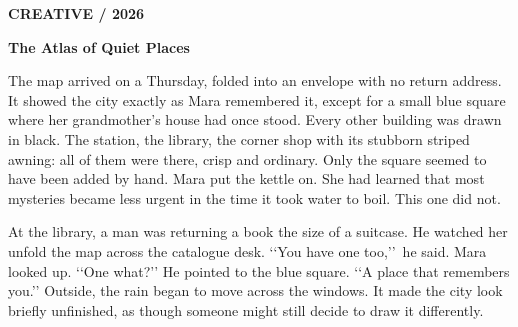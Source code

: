 \documentclass[11pt,a4paper]{article}
\newcommand{\eyebrow}[1]{{\small\sffamily\bfseries\color{accent}#1}\par\vspace{5mm}}
\newcommand{\hero}[2]{{\fontsize{32}{36}\selectfont\sffamily\bfseries #1\par}\vspace{4mm}{\large\color{quiet}#2\par}\vspace{6mm}{\color{accent}\rule{\linewidth}{1.5pt}}\vspace{5mm}}
\begin{document}
\eyebrow{CREATIVE / 2026}
\hero{The Atlas of Quiet Places}{A short story / Alex Morgan}
\vspace{8mm}
The map arrived on a Thursday, folded into an envelope with no return address. It showed the city exactly as Mara remembered it, except for a small blue square where her grandmother's house had once stood.
Every other building was drawn in black. The station, the library, the corner shop with its stubborn striped awning: all of them were there, crisp and ordinary. Only the square seemed to have been added by hand.
Mara put the kettle on. She had learned that most mysteries became less urgent in the time it took water to boil. This one did not.
\begin{center}\vspace{5mm}\textasteriskcentered\quad\textasteriskcentered\quad\textasteriskcentered\vspace{5mm}\end{center}
At the library, a man was returning a book the size of a suitcase. He watched her unfold the map across the catalogue desk.
\lq\lq You have one too,\rq\rq\ he said.
Mara looked up. \lq\lq One what?\rq\rq
He pointed to the blue square. \lq\lq A place that remembers you.\rq\rq
Outside, the rain began to move across the windows. It made the city look briefly unfinished, as though someone might still decide to draw it differently.
\vspace{8mm}{\small\itshape Continue the story here. Use a centred scene break to mark a shift in time, place, or point of view.}
\end{document}
